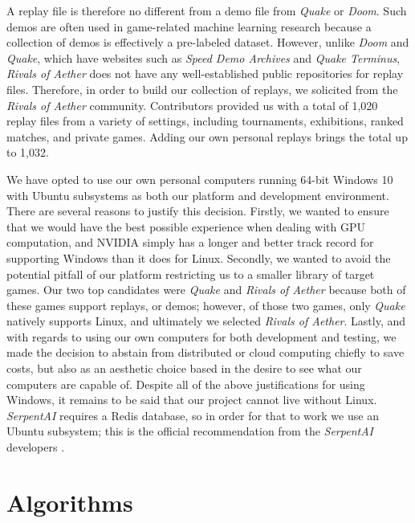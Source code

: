 A replay file is therefore no different from a demo file from {\it Quake} or {\it Doom}. Such demos are often used in game-related machine learning research because a collection of demos is effectively a pre-labeled dataset. However, unlike {\it Doom} and {\it Quake}, which have websites such as {\it Speed Demo Archives} and {\it Quake Terminus}, {\it Rivals of Aether} does not have any well-established public repositories for replay files. Therefore, in order to build our collection of replays, we solicited from the {\it Rivals of Aether} community. Contributors provided us with a total of 1,020 replay files from a variety of settings, including tournaments, exhibitions, ranked matches, and private games. Adding our own personal replays brings the total up to 1,032. 

We have opted to use our own personal computers running 64-bit Windows 10 with Ubuntu subsystems as both our platform and development environment. There are several reasons to justify this decision. Firstly, we wanted to ensure that we would have the best possible experience when dealing with GPU computation, and NVIDIA simply has a longer and better track record for supporting Windows than it does for Linux. Secondly, we wanted to avoid the potential pitfall of our platform restricting us to a smaller library of target games. Our two top candidates were {\it Quake} and {\it Rivals of Aether} because both of these games support replays, or demos; however, of those two games, only {\it Quake} natively supports Linux, and ultimately we selected {\it Rivals of Aether}. Lastly, and with regards to using our own computers for both development and testing, we made the decision to abstain from distributed or cloud computing chiefly to save costs, but also as an aesthetic choice based in the desire to see what our computers are capable of. Despite all of the above justifications for using Windows, it remains to be said that our project cannot live without Linux. {\it SerpentAI} requires a Redis database, so in order for that to work we use an Ubuntu subsystem; this is the official recommendation from the {\it SerpentAI} developers \cite{SerpentAI}.




\section{Algorithms}

